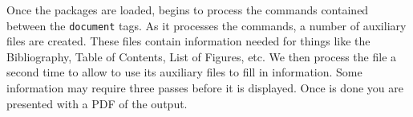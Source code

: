Once the packages are loaded, \lt begins to process the commands contained between the \texttt{document} tags. As it processes the commands, a number of auxiliary files are created. These files contain information needed for things like the Bibliography, Table of Contents, List of Figures, etc. We then process the file a second time to allow \lt to use its auxiliary files to fill in information. Some information may require three passes before it is displayed. Once \lt is done you are presented with a PDF of the output.

